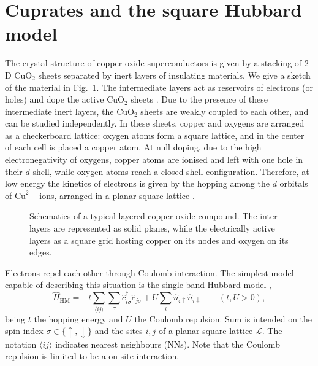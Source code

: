 \section{Cuprates and the square Hubbard model}\label{sec:hubbard-cuprates}

The crystal structure of copper oxide superconductors is given by a stacking of $2$D $\mathrm{Cu} \mathrm{O}_2$ sheets separated by inert layers of insulating materials. We give a sketch of the material in Fig.~\ref{fig:copper-oxides}. The intermediate layers act as reservoirs of electrons (or holes) and dope the active $\mathrm{Cu} \mathrm{O}_2$ sheets \cite{grosso2014solid}. Due to the presence of these intermediate inert layers, the $\mathrm{Cu} \mathrm{O}_2$ sheets are weakly coupled to each other, and can be studied independently. In these sheets, copper and oxygens are arranged as a checkerboard lattice: oxygen atoms form a square lattice, and in the center of each cell is placed a copper atom. At null doping, due to the high electronegativity of oxygens, copper atoms are ionised and left with one hole in their $d$ shell, while oxygen atoms reach a closed shell configuration. Therefore, at low energy the kinetics of electrons is given by the hopping among the $d$ orbitals of $\mathrm{Cu}^{2+}$ ions, arranged in a planar square lattice \cite{lee2006doping}.

\begin{figure}
	\centering
	
	\caption{Schematics of a typical layered copper oxide compound. The inter layers are represented as solid planes, while the electrically active layers as a square grid hosting copper on its nodes and oxygen on its edges.}
	\label{fig:copper-oxides}
\end{figure}

Electrons repel each other through Coulomb interaction. The simplest model capable of describing this situation is the single-band Hubbard model \cite{hubbard1963electron},
\begin{equation}\label{eq:hubbard-model}
	\hat H_\mathrm{HM} = 
	-t \sum_{\langle ij \rangle} \sum_\sigma \hat c_{i\sigma}^\dagger \hat c_{j\sigma}
	+ U \sum_i \hat n_{i\uparrow} \hat n_{i\downarrow}
	\qquad
	(t, U  > 0),
\end{equation}
being $t$ the hopping energy and $U$ the Coulomb repulsion. Sum is intended on the spin index $\sigma \in \lbrace \uparrow, \downarrow \rbrace$ and the sites $i,j$ of a planar square lattice $\mathcal{L}$. The notation $\langle ij \rangle$ indicates nearest neighbours (NNs). Note that the Coulomb repulsion is limited to be a on-site interaction. 

